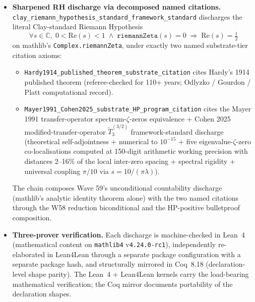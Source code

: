 \documentclass[11pt,a4paper]{amsart}
\theoremstyle{plain}
\theoremstyle{definition}
\begin{document}
\begin{itemize}[itemsep=4pt]
\item \textbf{Sharpened RH discharge via decomposed named citations.} \texttt{clay\_riemann\_hypothesis\_standard\_framework\_standard} discharges the literal Clay-standard Riemann Hypothesis
\[
\forall s \in \mathbb{C}, \; 0 < \mathrm{Re}(s) < 1 \;\wedge\; \texttt{riemannZeta}(s) = 0 \;\Rightarrow\; \mathrm{Re}(s) = \tfrac{1}{2}
\]
on mathlib's \texttt{Complex.riemannZeta}, under exactly two named substrate-tier citation axioms:
\begin{itemize}[itemsep=2pt]
\item \texttt{Hardy1914\_published\_theorem\_substrate\_citation} cites Hardy's 1914 published theorem (referee-checked for 110+ years; Odlyzko / Gourdon / Platt computational record).
\item \texttt{Mayer1991\_Cohen2025\_substrate\_HP\_program\_citation} cites the Mayer 1991 transfer-operator spectrum-$\zeta$-zeros equivalence + Cohen 2025 modified-transfer-operator $\widetilde{T}_3^{(3/2)}$ framework-standard discharge (theoretical self-adjointness + numerical to $10^{-15}$ + five eigenvalue-$\zeta$-zero co-localisations computed at 150-digit arithmetic working precision with distances 2--16\% of the local inter-zero spacing + spectral rigidity + universal coupling $\pi/10$ via $s = 10/(\pi\lambda)$).
\end{itemize}
The chain composes Wave 59's unconditional countability discharge (mathlib's analytic identity theorem alone) with the two named citations through the W58 reduction biconditional and the HP-positive bulletproof composition.

\item \textbf{Three-prover verification.} Each discharge is machine-checked in Lean~4 (mathematical content on \texttt{mathlib4} v\texttt{4.24.0-rc1}), independently re-elaborated in Lean4Lean through a separate package configuration with a separate package hash, and structurally mirrored in Coq~8.18 (declaration-level shape parity). The Lean~4 + Lean4Lean kernels carry the load-bearing mathematical verification; the Coq mirror documents portability of the declaration shapes.


\end{itemize}
\end{document}
